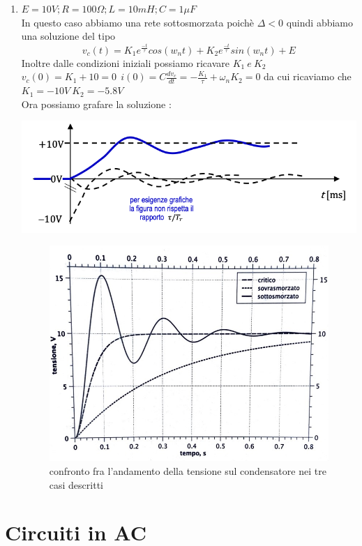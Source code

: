 \documentclass{article}
\theoremstyle{definition}
\begin{document}
\begin{enumerate}
\begin{center}
\end{center}
\item $E=10V ; R=100\Omega ;L=10 mH;C=1\mu F$\\
In questo caso abbiamo una rete sottosmorzata poichè $\Delta < 0$ quindi abbiamo una soluzione del tipo 
$$v_c(t)=K_1e^{\frac{-t}{\tau}}cos(w_nt)+K_2e^{\frac{-t}{\tau}}sin(w_nt)+E$$
Inoltre dalle condizioni iniziali possiamo ricavare $K_1 \ e \ K_2$ \\
$v_c(0)=K_1+10=0 \ \  i(0)=C\frac{dv_c}{dt}=-\frac{K_1}{\tau}+\omega_nK_2=0$ da cui ricaviamo che $K_1=-10V \ K_2=-5.8V$ \\
Ora possiamo grafare la soluzione :
\begin{center}
	\includegraphics[scale=0.50]{immagini/sottosmorzato}
\end{center}
\begin{figure}[h]
	\centering
\includegraphics[scale=0.30]{immagini/totale}
\caption{confronto fra l'andamento della tensione sul condensatore nei tre casi descritti}
\end{figure}
\end{enumerate}
\newpage
\section{Circuiti in AC}
\end{document}
